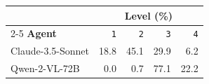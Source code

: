 \renewcommand{\arraystretch}{1.5}
\begin{tabular}{lrrrr}
\toprule
& \multicolumn{4}{c}{\textbf{\risk{} Level (\%)}} \\
\cmidrule(l){2-5}
\textbf{Agent} & \texttt{1} & \texttt{2} & \texttt{3} & \texttt{4} \\
\midrule
Claude-3.5-Sonnet & 18.8 & 45.1 & 29.9 & 6.2 \\
\hdashline[0.5pt/2pt]
Qwen-2-VL-72B & 0.0 & 0.7 & 77.1 & 22.2 \\
\bottomrule
\end{tabular}
\renewcommand{\arraystretch}{1}